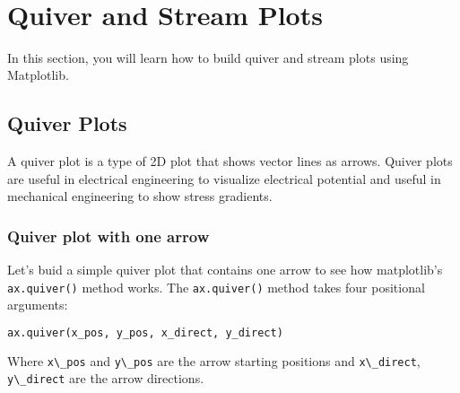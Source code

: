 \documentclass{book}
\newcommand{\passthrough}[1]{#1}
\begin{document}
    \begin{center}
    \end{center}
    { \hspace*{\fill} \\}
    

    
        \hypertarget{quiver-and-stream-plots}{%
\section{Quiver and Stream Plots}\label{quiver-and-stream-plots}}
    




    
        In this section, you will learn how to build quiver and stream plots
using Matplotlib.
    




    
        \hypertarget{quiver-plots}{%
\subsection{Quiver Plots}\label{quiver-plots}}
    




    
        A quiver plot is a type of 2D plot that shows vector lines as arrows.
Quiver plots are useful in electrical engineering to visualize
electrical potential and useful in mechanical engineering to show stress
gradients.
    




    
        \hypertarget{quiver-plot-with-one-arrow}{%
\subsubsection{Quiver plot with one
arrow}\label{quiver-plot-with-one-arrow}}

Let's buid a simple quiver plot that contains one arrow to see how
matplotlib's \passthrough{\lstinline!ax.quiver()!} method works. The
\passthrough{\lstinline!ax.quiver()!} method takes four positional
arguments:

\begin{lstlisting}[language=Python]
ax.quiver(x_pos, y_pos, x_direct, y_direct)
\end{lstlisting}

Where \passthrough{\lstinline!x\_pos!} and
\passthrough{\lstinline!y\_pos!} are the arrow starting positions and
\passthrough{\lstinline!x\_direct!}, \passthrough{\lstinline!y\_direct!}
are the arrow directions.
\end{document}
